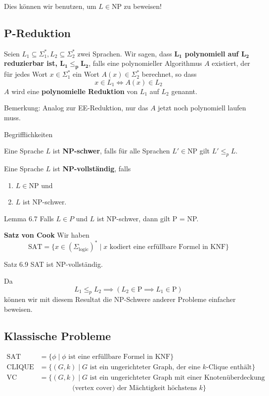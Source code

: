 \documentclass[a4paper, 11pt]{article}
\newcommand\myTitle[1]{{\large \textbf {#1}}}
\begin{document}
	Dies können wir benutzen, um $L \in \text{NP}$ zu beweisen!

\subsection{P-Reduktion}
	\begin{mainbox}{}
		Seien $L_1 \subseteq \Sigma_1^*, L_2 \subseteq \Sigma_2^*$ zwei Sprachen. 
		Wir sagen, dass \textbf{$\mathbf{L_1}$ polynomiell auf $\mathbf{L_2}$ reduzierbar 
		ist, $\mathbf{L_1 \leq_{p} L_2}$}, falls eine polynomieller Algorithmus $A$ existiert, 
		der für jedes Wort $x \in \Sigma_1^*$ ein Wort $A(x) \in \Sigma_2^*$ berechnet, so dass
		$$x \in L_1 \iff A(x) \in L_2$$
		$A$ wird eine \textbf{polynomielle Reduktion} von $L_1$ auf $L_2$ genannt. 
	\end{mainbox}
	Bemerkung: Analog zur EE-Reduktion, nur das $A$ jetzt noch polynomiell laufen muss.

{Begrifflichkeiten}
	\begin{mainbox}{}
		Eine Sprache $L$ ist \textbf{NP-schwer}, falls für alle Sprachen $L' \in $NP gilt $L' \leq_p L$.

		Eine Sprache $L$ ist \textbf{NP-vollständig}, falls
		\begin{enumerate}[label=(\roman*)]
			\item $L \in $NP und
			\item $L$ ist NP-schwer.
		\end{enumerate}
	\end{mainbox}
	\begin{mainbox}{Lemma 6.7}
		Falls $L \in P$ und $L$ ist NP-schwer, dann gilt P = NP.
	\end{mainbox}


\myTitle{Satz von Cook}
	Wir haben 
	$$\text{SAT} = \{x \in (\Sigma_{\text{logic}})^* \mid x \text{ kodiert eine erfüllbare Formel in KNF}\}$$

	\begin{mainbox}{Satz 6.9}
		SAT ist NP-vollständig.
	\end{mainbox}
	Da $$L_1 \leq_{p} L_2 \implies (L_2 \in \text{P} \implies L_1 \in \text{P})$$
	können wir mit diesem Resultat die NP-Schwere anderer Probleme einfacher beweisen.


\subsection{Klassische Probleme}
	\begin{align*}
		\text{SAT} &= \{\phi \mid \phi \text{ ist eine erfüllbare Formel in KNF}\}\\
		\text{CLIQUE} &= \{(G, k) \mid G \text{ ist ein ungerichteter Graph, der eine $k$-Clique enthält}\}\\
		\text{VC} &= \{(G, k) \mid G \text{ ist ein ungerichteter Graph mit einer Knotenüberdeckung}\\ 
		 & \hspace{2cm}\text{(vertex cover) der Mächtigkeit höchstens }k\}
	\end{align*}
	
\end{document}

